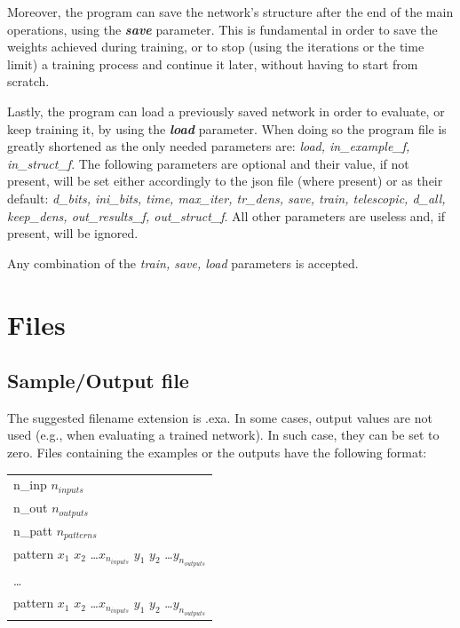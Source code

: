 \documentclass{article}
\begin{document}
Moreover, the program can save the network's structure after the end of the main operations, using the \textbf{\textit{save}} parameter. This is fundamental in order to save the weights achieved during training, or to stop (using the iterations or the time limit) a training process and continue it later, without having to start from scratch.

Lastly, the program can load a previously saved network in order to evaluate, or keep training it, by using the \textbf{\textit{load}} parameter. When doing so the program file is greatly shortened as the only needed parameters are: \textit{load, in\_example\_f, in\_struct\_f}. The following parameters are optional and their value, if not present, will be set either accordingly to the json file (where present) or as their default: \textit{d\_bits, ini\_bits, time, max\_iter, tr\_dens, save, train, telescopic, d\_all, keep\_dens, out\_results\_f, out\_struct\_f}. All other parameters are useless and, if present, will be ignored.

Any combination of the \textit{train, save, load} parameters is accepted.


\section{Files}\label{section:files}

\subsection{Sample/Output file}
The suggested filename extension is .exa. In some cases, output values are
not used (e.g., when evaluating a trained network). In such case, they can be
set to zero.
Files containing the examples or the outputs have the following format:
\\
\begin{table}[h]
    \centering
    \begin{tabular}{l}
        \hline
        n\_inp $n_{inputs}$ \\
        n\_out $n_{outputs}$ \\
        n\_patt $n_{patterns}$ \\
        pattern $x_1$ \quad $x_2$ \quad \ldots \quad $x_{n_{inputs}}$ \quad $y_1$ \quad $y_2$ \quad \ldots \quad $y_{n_{outputs}}$ \\
        \ldots \\
        pattern $x_1$ \quad $x_2$ \quad \ldots \quad $x_{n_{inputs}}$ \quad $y_1$ \quad $y_2$ \quad \ldots \quad $y_{n_{outputs}}$ \\
        \hline
   \end{tabular}
\end{table}  
\end{document}
